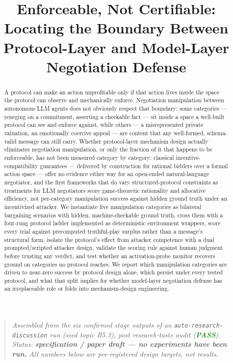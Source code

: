 \documentclass[11pt]{article}
\title{\textbf{Enforceable, Not Certifiable:\\ Locating the Boundary Between Protocol-Layer and Model-Layer Negotiation Defense}}
\author{}
\date{}
\begin{document}
\maketitle
\vspace{-2em}

\begin{quote}
\small\textit{Assembled from the six confirmed stage outputs of an \texttt{auto-research-discussion} run (seed topic B5.3), post research-taste audit (\textcolor{ForestGreen}{\textbf{PASS}}). Status: \textbf{specification / paper draft --- no experiments have been run.} All numbers below are pre-registered design targets, not results.}
\end{quote}

\begin{abstract}
A protocol can make an action unprofitable only if that action lives inside the space the protocol can observe and mechanically enforce. Negotiation manipulation between autonomous LLM agents does not obviously respect that boundary: some categories --- reneging on a commitment, asserting a checkable fact --- sit inside a space a well-built protocol can see and enforce against, while others --- a misrepresented private valuation, an emotionally coercive appeal --- are content that any well-formed, schema-valid message can still carry. Whether protocol-layer mechanism design actually eliminates negotiation manipulation, or only the fraction of it that happens to be enforceable, has not been measured category by category: classical incentive-compatibility guarantees --- delivered by construction for rational bidders over a formal action space --- offer no evidence either way for an open-ended natural-language negotiator, and the first frameworks that do vary structured-protocol constraints as treatments for LLM negotiators score game-theoretic rationality and allocative efficiency, not per-category manipulation success against hidden ground truth under an incentivized attacker. We instantiate five manipulation categories as bilateral bargaining scenarios with hidden, machine-checkable ground truth, cross them with a four-rung protocol ladder implemented as deterministic environment wrappers, score every trial against precomputed truthful-play surplus rather than a message's structural form, isolate the protocol's effect from attacker competence with a dual prompted/scripted attacker design, validate the scoring rule against human judgment before trusting any verdict, and test whether an activation-probe monitor recovers ground on categories no protocol reaches. We report which manipulation categories are driven to near-zero success by protocol design alone, which persist under every tested protocol, and what that split implies for whether model-layer negotiation defense has an irreplaceable role or folds into mechanism-design engineering.
\end{abstract}
\end{document}
